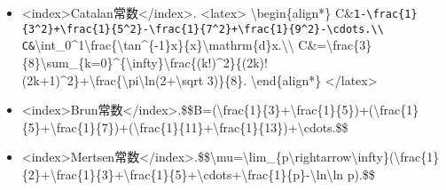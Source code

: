 \documentclass[
]{article}
\begin{document}
\begin{itemize}
\item
  \textless index\textgreater Catalan常数\textless/index\textgreater.
  \textless latex\textgreater{} \textbackslash begin\{align*\}
  C\&\texttt{1-\textbackslash{}frac\{1\}\{3\^{}2\}+\textbackslash{}frac\{1\}\{5\^{}2\}-\textbackslash{}frac\{1\}\{7\^{}2\}+\textbackslash{}frac\{1\}\{9\^{}2\}-\textbackslash{}cdots.\textbackslash{}\textbackslash{}
  C\&}\textbackslash int\_0\^{}1\textbackslash frac\{\textbackslash tan\^{}\{-1\}x\}\{x\}\textbackslash mathrm\{d\}x.\textbackslash\textbackslash{}
  C\&=\textbackslash frac\{3\}\{8\}\textbackslash sum\_\{k=0\}\^{}\{\textbackslash infty\}\textbackslash frac\{(k!)\^{}2\}\{(2k)!(2k+1)\^{}2\}+\textbackslash frac\{\textbackslash pi\textbackslash ln(2+\textbackslash sqrt
  3)\}\{8\}. \textbackslash end\{align*\} \textless/latex\textgreater{}
\item
  \textless index\textgreater Brun常数\textless/index\textgreater.\$\$B=(\textbackslash frac\{1\}\{3\}+\textbackslash frac\{1\}\{5\})+(\textbackslash frac\{1\}\{5\}+\textbackslash frac\{1\}\{7\})+(\textbackslash frac\{1\}\{11\}+\textbackslash frac\{1\}\{13\})+\textbackslash cdots.\$\$
\item
  \textless index\textgreater Mertsen常数\textless/index\textgreater.\$\$\textbackslash mu=\textbackslash lim\_\{p\textbackslash rightarrow\textbackslash infty\}(\textbackslash frac\{1\}\{2\}+\textbackslash frac\{1\}\{3\}+\textbackslash frac\{1\}\{5\}+\textbackslash cdots+\textbackslash frac\{1\}\{p\}-\textbackslash ln\textbackslash ln
  p).\$\$
\end{itemize}
\end{document}
